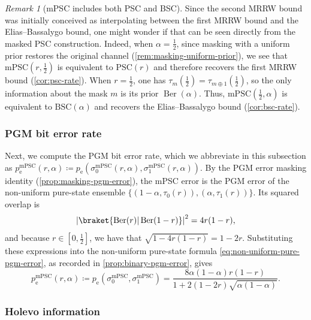 \documentclass[11pt]{article}
\theoremstyle{remark}
\newtheorem{remark}{Remark}[section]
\newcommand{\Ber}{\operatorname{Ber}}
\newcommand{\abs}[1]{\left|#1\right|}
\newcommand{\BSC}{\mathrm{BSC}}
\newcommand{\PSC}{\mathrm{PSC}}
\newcommand{\mPSC}{\mathrm{mPSC}}
\begin{document}
\begin{remark}[mPSC includes both PSC and BSC]
\label{rem:mpsc-endpoints}
Since the second MRRW bound was initially conceived as interpolating between the first MRRW bound and the Elias--Bassalygo bound, one might wonder if that can be seen directly from the masked PSC construction. Indeed, when $\alpha = \frac{1}{2}$, since masking with a uniform prior restores the original channel (\cref{rem:masking-uniform-prior}), we see that $\mPSC(r,\frac{1}{2})$ is equivalent to $\PSC(r)$ and therefore recovers the first MRRW bound (\cref{cor:psc-rate}). When $r = \frac{1}{2}$, one has $\tau_m(\frac{1}{2}) = \tau_{m \oplus 1}(\frac{1}{2})$, so the only information about the mask $m$ is its prior $\Ber(\alpha)$. Thus, $\mPSC(\tfrac{1}{2},\alpha)$ is equivalent to $\BSC(\alpha)$ and recovers the Elias--Bassalygo bound (\cref{cor:bsc-rate}).
\end{remark}

\subsubsection{PGM bit error rate}
\label{subsubsec:mpsc-pgm-error}

Next, we compute the PGM bit error rate, which we abbreviate in this subsection as $p_{\mathrm{e}}^{\mPSC}(r,\alpha) \coloneqq p_{\mathrm{e}}(\sigma_0^{\mPSC}(r,\alpha),\sigma_1^{\mPSC}(r,\alpha))$. By the PGM error masking identity (\cref{prop:masking-pgm-error}), the mPSC error is the PGM error of the non-uniform pure-state ensemble $\{(1-\alpha,\tau_0(r)),(\alpha,\tau_1(r))\}$. Its squared overlap is
\begin{equation*}
\abs{\braket{\Ber(r)|\Ber(1-r)}}^2 = 4r(1-r),
\end{equation*}
and because $r \in [0,\frac{1}{2}]$, we have that $\sqrt{1-4r(1-r)} = 1-2r$. Substituting these expressions into the non-uniform pure-state formula \eqref{eq:non-uniform-pure-pgm-error}, as recorded in \cref{prop:binary-pgm-error}, gives
\begin{equation}
\label{eq:mpsc-pgm-error}
p_{\mathrm{e}}^{\mPSC}(r,\alpha)
\coloneqq p_{\mathrm{e}}\left(\sigma_0^{\mPSC},\sigma_1^{\mPSC}\right)
= \frac{8\alpha(1-\alpha)r(1-r)}
{1+2(1-2r)\sqrt{\alpha(1-\alpha)}}.
\end{equation}

\subsubsection{Holevo information}
\label{subsubsec:mpsc-holevo}
\end{document}
